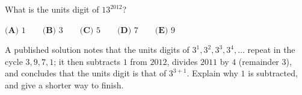 What is the units digit of $13^{2012}$?

$\textbf{(A) }1\qquad\textbf{(B) }3\qquad\textbf{(C) }5\qquad\textbf{(D) }7\qquad\textbf{(E) }9$

A published solution notes that the units digits of $3^1,3^2,3^3,3^4,\dots$ repeat in the cycle $3,9,7,1$; it then subtracts $1$ from $2012$, divides $2011$ by $4$ (remainder $3$), and concludes that the units digit is that of $3^{3+1}$. Explain why $1$ is subtracted, and give a shorter way to finish.
